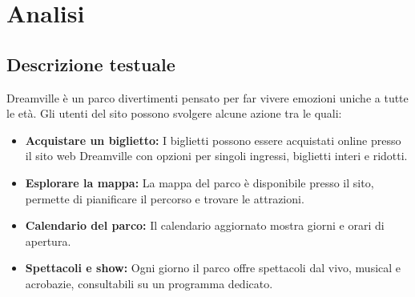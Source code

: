 \section{Analisi}
\subsection{Descrizione testuale}

Dreamville è un parco divertimenti pensato per far vivere emozioni uniche a tutte le età.
Gli utenti del sito possono svolgere alcune azione tra le quali:
\begin{itemize}
    \item \textbf{Acquistare un biglietto:} I biglietti possono essere acquistati online presso il sito web Dreamville con opzioni per singoli ingressi, biglietti interi e ridotti.
    \item \textbf{Esplorare la mappa:} La mappa del parco è disponibile presso il sito, permette di pianificare il percorso e trovare le attrazioni.
    \item \textbf{Calendario del parco:} Il calendario aggiornato mostra giorni e orari di apertura.
    \item \textbf{Spettacoli e show:} Ogni giorno il parco offre spettacoli dal vivo, musical e acrobazie, consultabili su un programma dedicato.
\end{itemize}
